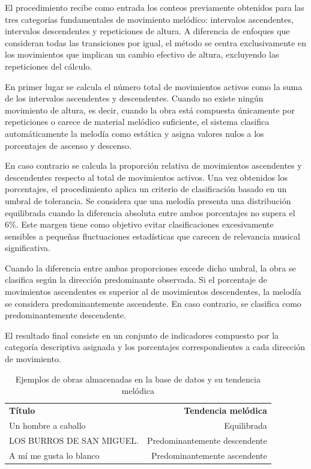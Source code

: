 El procedimiento recibe como entrada los conteos previamente obtenidos para las tres categorías fundamentales de movimiento melódico: intervalos ascendentes, intervalos descendentes y repeticiones de altura. A diferencia de enfoques que consideran todas las transiciones por igual, el método se centra exclusivamente en los movimientos que implican un cambio efectivo de altura, excluyendo las repeticiones del cálculo.

En primer lugar se calcula el número total de movimientos activos como la suma de los intervalos ascendentes y descendentes. Cuando no existe ningún movimiento de altura, es decir, cuando la obra está compuesta únicamente por repeticiones o carece de material melódico suficiente, el sistema clasifica automáticamente la melodía como estática y asigna valores nulos a los porcentajes de ascenso y descenso.

En caso contrario se calcula la proporción relativa de movimientos ascendentes y descendentes respecto al total de movimientos activos. Una vez obtenidos los porcentajes, el procedimiento aplica un criterio de clasificación basado en un umbral de tolerancia. Se considera que una melodía presenta una distribución equilibrada cuando la diferencia absoluta entre ambos porcentajes no supera el 6\%. Este margen tiene como objetivo evitar clasificaciones excesivamente sensibles a pequeñas fluctuaciones estadísticas que carecen de relevancia musical significativa.

Cuando la diferencia entre ambas proporciones excede dicho umbral, la obra se clasifica según la dirección predominante observada. Si el porcentaje de movimientos ascendentes es superior al de movimientos descendentes, la melodía se considera predominantemente ascendente. En caso contrario, se clasifica como predominantemente descendente.

El resultado final consiste en un conjunto de indicadores compuesto por la categoría descriptiva asignada y los porcentajes correspondientes a cada dirección de movimiento.

\begin{table}[H]
\centering
\begin{tabular}{lr}
\textbf{Título} & \textbf{Tendencia melódica} \\
Un hombre a caballo & Equilibrada \\
LOS BURROS DE SAN MIGUEL. & Predominantemente descendente \\
A mí me gusta lo blanco & Predominantemente ascendente \\
\end{tabular}
\caption{Ejemplos de obras almacenadas en la base de datos y su tendencia melódica}
\end{table}

